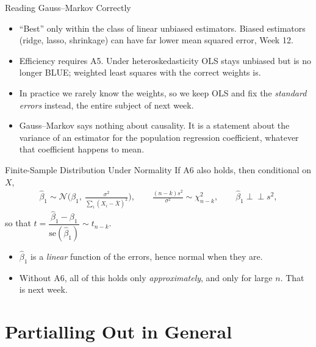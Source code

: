 \documentclass[aspectratio=169,11pt,xcolor=dvipsnames]{beamer}
\newcommand{\indep}{\perp\!\!\!\perp}
\begin{document}
\begin{frame}{Reading Gauss--Markov Correctly}
\begin{itemize}\itemsep5pt
  \item ``Best'' only \alert{within the class of linear unbiased} estimators.
        Biased estimators (ridge, lasso, shrinkage) can have far lower mean
        squared error, Week 12.
  \item Efficiency requires A5. Under heteroskedasticity OLS stays unbiased but is
        no longer BLUE; weighted least squares with the correct weights is.
  \item In practice we rarely know the weights, so we keep OLS and fix the
        \emph{standard errors} instead, the entire subject of next week.
  \item Gauss--Markov says nothing about causality. It is a statement about the
        variance of an estimator for the population regression coefficient,
        whatever that coefficient happens to mean.
\end{itemize}
\end{frame}

\begin{frame}{Finite-Sample Distribution Under Normality}
If A6 also holds, then conditional on $X$,
\begin{align*}
  \hat\beta_1 \sim \mathcal{N}\Big(\beta_1,\ \tfrac{\sigma^2}{\sum_i (X_i-\bar X)^2}\Big),
  \qquad
  \frac{(n-k)s^2}{\sigma^2} \sim \chi^2_{n-k},
  \qquad
  \hat\beta_1 \indep s^2 ,
\end{align*}
so that
$t = \dfrac{\hat\beta_1 - \beta_1}{\mathrm{se}(\hat\beta_1)} \sim t_{n-k}$.
\vskip6pt
\begin{itemize}
  \item $\hat\beta_1$ is a \emph{linear} function of the errors, hence normal when
        they are.
  \item Without A6, all of this holds only \emph{approximately}, and only for
        large $n$. That is next week.
\end{itemize}
\end{frame}

\section[Partialling Out]{Partialling Out in General}
\begin{frame}\sectionpage\end{frame}
\end{document}
